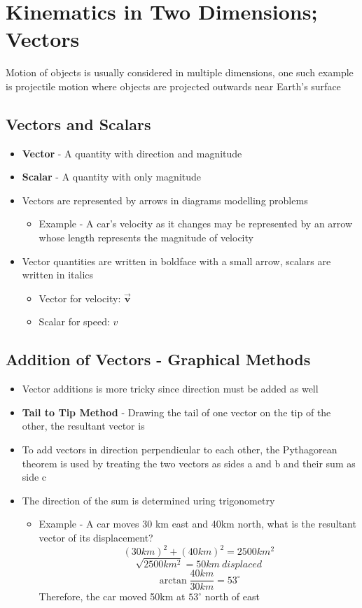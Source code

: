 \section{Kinematics in Two Dimensions; Vectors}
Motion of objects is usually considered in multiple dimensions, one such example is projectile motion where objects are projected outwards near Earth's surface

\subsection{Vectors and Scalars}
\begin{itemize}
    \item \textbf{Vector} - A quantity with direction and magnitude
    \item \textbf{Scalar} - A quantity with only magnitude
    \item Vectors are represented by arrows in diagrams modelling problems
    \begin{itemize}
        \item Example - A car's velocity as it changes may be represented by an arrow whose length represents the magnitude of velocity
    \end{itemize}
    \item Vector quantities are written in boldface with a small arrow, scalars are written in italics
    \begin{itemize}
        \item Vector for velocity: $\vec{\textbf{v}}$
        \item Scalar for speed: $v$
    \end{itemize}
\end{itemize}

\subsection{Addition of Vectors - Graphical Methods}
\begin{itemize}
    \item Vector additions is more tricky since direction must be added as well
    \item \textbf{Tail to Tip Method} - Drawing the tail of one vector on the tip of the other, the resultant vector is 
    \item To add vectors in direction perpendicular to each other, the Pythagorean theorem is used by treating the two vectors as sides a and b and their sum as side c
    \item The direction of the sum is determined uring trigonometry
    \begin{itemize}
        \item Example - A car moves 30 km east and 40km north, what is the resultant vector of its displacement?
        \[(30km)^2+(40km)^2=2500km^2\]
        \[\sqrt{2500km^2}=50km\ displaced\]
        \[\arctan{\frac{40km}{30km}}=53^\circ\]
        Therefore, the car moved 50km at $53^\circ$ north of east
    \end{itemize}
\end{itemize}

